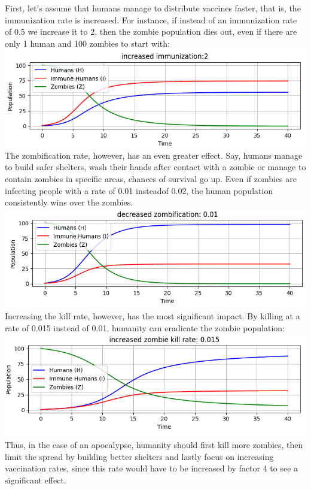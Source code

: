\documentclass[
	12pt
]{article}
\begin{document}
First, let's assume that humans manage to distribute vaccines faster, that is, the immunization rate is increased. For instance, if instead of an immunization rate of 0.5 we increase it to 2, then the zombie population dies out, even if there are only 1 human and 100 zombies to start with:
\\
\includegraphics[width= \textwidth]{increased immunization.png}
\\
The zombification rate, however, has an even greater effect. Say, humans manage to build safer shelters, wash their hands after contact with a zombie or manage to contain zombies in specific areas, chances of survival go up. Even if zombies are infecting people with a rate of 0.01 insteadof 0.02, the human population consistently wins over the zombies.\\
\includegraphics[width= \textwidth]{zombification.png}\\
Increasing the kill rate, however, has the most significant impact. By killing at a rate of 0.015 instead of 0.01, humanity can eradicate the zombie population:\\
\includegraphics[width= \textwidth]{zombie kill rate.png}\\
Thus, in the case of an apocalypse, humanity should first kill more zombies, then limit the spread by building better shelters and lastly focus on increasing vaccination rates, since this rate would have to be increased by factor 4 to see a significant effect.
\end{document}
